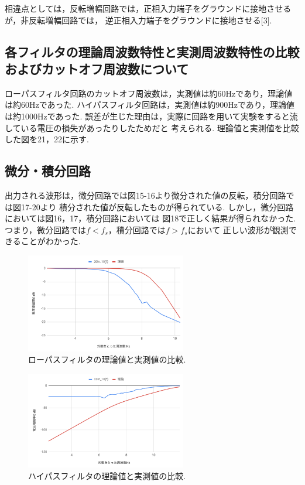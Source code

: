 \documentclass[twocolumn, 10pt,a4j]{jsarticle}
\begin{document}
        相違点としては，反転増幅回路では，正相入力端子をグラウンドに接地させるが，非反転増幅回路では，
        逆正相入力端子をグラウンドに接地させる[3].

      \subsection{各フィルタの理論周波数特性と実測周波数特性の比較およびカットオフ周波数について}
        ローパスフィルタ回路のカットオフ周波数は，実測値は約60Hzであり，理論値は約60Hzであった.
        ハイパスフィルタ回路は，実測値は約900Hzであり，理論値は約1000Hzであった.
        誤差が生じた理由は，実際に回路を用いて実験をすると流している電圧の損失があったりしたためだと
        考えられる.
        理論値と実測値を比較した図を21，22に示す.
      
      \subsection{微分・積分回路}
        出力される波形は，微分回路では図15-16より微分された値の反転，積分回路では図17-20より
        積分された値が反転したものが得られている. しかし，微分回路においては図16，17，積分回路においては
        図18で正しく結果が得られなかった. つまり，微分回路では$f < f_{s}$，積分回路では$f>f_{s}$において
        正しい波形が観測できることがわかった.




        \begin{figure}[]
          \begin{center}
              \includegraphics[width=7cm]{../img/result_riron_low.png}
              \caption{ローパスフィルタの理論値と実測値の比較.}
          \end{center}
        \end{figure}

        \begin{figure}[]
          \begin{center}
              \includegraphics[width=7cm]{../img/result_riron_high.png}
              \caption{ハイパスフィルタの理論値と実測値の比較.}
          \end{center}
        \end{figure}
        
\end{document}
